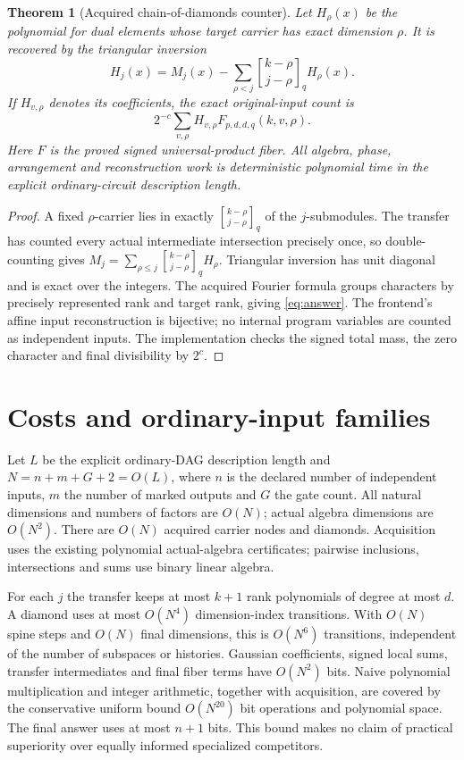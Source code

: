\documentclass[11pt]{article}
\newtheorem{theorem}{Theorem}\newtheorem{lemma}{Lemma}\newtheorem{corollary}{Corollary}
\newcommand{\gb}[2]{{#1\brack #2}_q}
\begin{document}
\begin{theorem}[Acquired chain-of-diamonds counter]
Let $H_\rho(x)$ be the polynomial for dual elements whose target carrier
has exact dimension $\rho$. It is recovered by the triangular inversion
\[
 H_j(x)=M_j(x)-\sum_{\rho<j}\gb{k-\rho}{j-\rho}H_\rho(x).
\]
If $H_{v,\rho}$ denotes its coefficients, the exact original-input count is
\begin{equation}\label{eq:answer}
 \boxed{2^{-c}\sum_{v,\rho}H_{v,\rho}
        F_{p,d,d,q}(k,v,\rho).}
\end{equation}
Here $F$ is the proved signed universal-product fiber. All algebra,
phase, arrangement and reconstruction work is deterministic polynomial
time in the explicit ordinary-circuit description length.
\end{theorem}
\begin{proof}
A fixed $\rho$-carrier lies in exactly
$\gb{k-\rho}{j-\rho}$ of the $j$-submodules. The transfer has counted every
actual intermediate intersection precisely once, so double-counting gives
$M_j=\sum_{\rho\le j}\gb{k-\rho}{j-\rho}H_\rho$.
Triangular inversion has unit diagonal and is exact over the integers.
The acquired Fourier formula groups characters by precisely represented
rank and target rank, giving \eqref{eq:answer}. The frontend's affine
input reconstruction is bijective; no internal program variables are
counted as independent inputs. The implementation checks the signed total
mass, the zero character and final divisibility by $2^c$.
\end{proof}

\section{Costs and ordinary-input families}
Let $L$ be the explicit ordinary-DAG description length and
$N=n+m+G+2=O(L)$, where $n$ is the declared number of independent inputs,
$m$ the number of marked outputs and $G$ the gate count. All natural
dimensions and numbers of factors are $O(N)$; actual algebra dimensions
are $O(N^2)$. There are $O(N)$ acquired carrier nodes and diamonds.
Acquisition uses the existing polynomial actual-algebra certificates;
pairwise inclusions, intersections and sums use binary linear algebra.

For each $j$ the transfer keeps at most $k+1$ rank polynomials of degree
at most $d$. A diamond uses at most $O(N^4)$ dimension-index transitions.
With $O(N)$ spine steps and $O(N)$ final dimensions, this is $O(N^6)$
transitions, independent of the number of subspaces or histories.
Gaussian coefficients, signed local sums, transfer intermediates and final
fiber terms have $O(N^2)$ bits. Naive polynomial multiplication and integer
arithmetic, together with acquisition, are covered by the conservative
uniform bound $O(N^{20})$ bit operations and polynomial space. The final
answer uses at most $n+1$ bits. This bound makes no claim of practical
superiority over equally informed specialized competitors.
\end{document}
